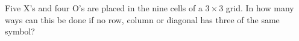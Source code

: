 Five X's and four O's are placed in the nine cells of a $3\times3$ grid. In how many ways can this be done if no row, column or diagonal has three of the same symbol?
